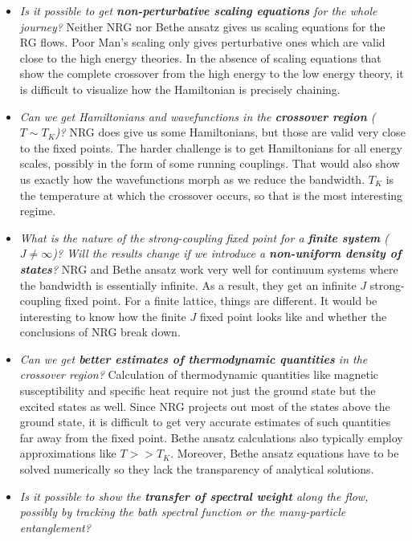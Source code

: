 \documentclass[12pt,twoside]{article}
\numberwithin{equation}{section}
\begin{document}
\begin{itemize}
    \item \textit{Is it possible to get \textbf{non-perturbative scaling equations} for the whole journey?}
    Neither NRG nor Bethe ansatz gives us scaling equations for the RG flows. Poor Man's scaling only gives perturbative ones which are valid close to the high energy theories. In the absence of scaling equations that show the complete crossover from the high energy to the low energy theory, it is difficult to visualize how the Hamiltonian is precisely chaining.
    \item \textit{Can we get Hamiltonians and wavefunctions in the \textbf{crossover region} (\(T \sim T_K\))?}
        NRG does give us some Hamiltonians, but those are valid very close to the fixed points. The harder challenge is to get Hamiltonians for all energy scales, possibly in the form of some running couplings. That would also show us exactly how the wavefunctions morph as we reduce the bandwidth. \(T_K\) is the temperature at which the crossover occurs, so that is the most interesting regime.
    \item \textit{What is the nature of the strong-coupling fixed point for a \textbf{finite system} (\(J \neq \infty\))? Will the results change if we introduce a \textbf{non-uniform density of states}?}
        NRG and Bethe ansatz work very well for continuum systems where the bandwidth is essentially infinite. As a result, they get an infinite \(J\) strong-coupling fixed point. For a finite lattice, things are different. It would be interesting to know how the finite \(J\) fixed point looks like and whether the conclusions of NRG break down.
    \item \textit{Can we get \textbf{better estimates of thermodynamic quantities} in the crossover region?}
        Calculation of thermodynamic quantities like magnetic susceptibility and specific heat require not just the ground state but the excited states as well. Since NRG projects out most of the states above the ground state, it is difficult to get very accurate estimates of such quantities far away from the fixed point. Bethe ansatz calculations also typically  employ approximations like \(T>>T_K\). Moreover, Bethe ansatz equations have to be solved numerically so they lack the transparency of analytical solutions.
    \item \textit{Is it possible to show the \textbf{transfer of spectral weight} along the flow, possibly by tracking the bath spectral function or the many-particle entanglement?}

\end{itemize}
\end{document}

